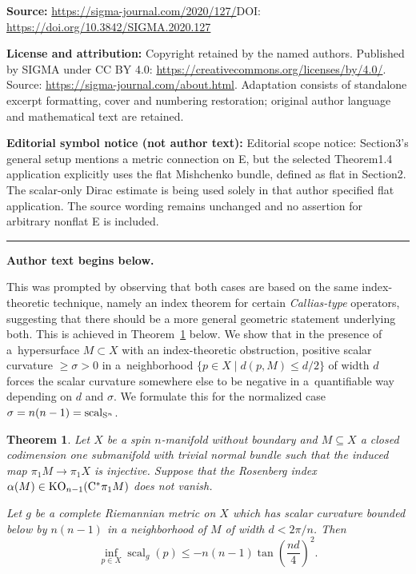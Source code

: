 \documentclass[11pt]{article}
\DeclareMathOperator{\scal}{scal}
\DeclareMathOperator{\KO}{KO}
\numberwithin{equation}{section}
\newtheorem{Theorem}{Theorem}[section]
\begin{document}
\noindent\textbf{Source:} \url{https://sigma-journal.com/2020/127/}\quad DOI: \url{https://doi.org/10.3842/SIGMA.2020.127}\par
\noindent\textbf{License and attribution:} Copyright retained by the named authors. Published by SIGMA under CC BY 4.0: \url{https://creativecommons.org/licenses/by/4.0/}. Source: \url{https://sigma-journal.com/about.html}. Adaptation consists of standalone excerpt formatting, cover and numbering restoration; original author language and mathematical text are retained.\par
\noindent\textbf{Editorial symbol notice (not author text):} Editorial scope notice: Section3’s general setup mentions a metric connection on E, but the selected Theorem1.4 application explicitly uses the flat Mishchenko bundle, defined as flat in Section2. The scalar-only Dirac estimate is being used solely in that author specified flat application. The source wording remains unchanged and no assertion for arbitrary nonflat E is included.\par
\medskip\hrule\medskip\noindent\textbf{Author text begins below.}\par
\setcounter{section}{1}
\setcounter{subsection}{0}
\setcounter{subsubsection}{0}
\setcounter{Theorem}{3}
\setcounter{equation}{0}
This was prompted by observing that both cases are based on the same index-theoretic technique, namely an index theorem for certain \emph{Callias-type} operators, suggesting that there should be a more general geometric statement underlying both.
This is achieved in Theorem~\ref{thm:quantitative-codim1-obstr} below.
We show that in the presence of a~hypersurface \(M \subset X\) with an index-theoretic obstruction, positive scalar curvature \(\geq \sigma > 0\) in a~neighborhood \(\{p \in X \mid d(p, M) \leq d/2 \}\) of width \(d\) forces the scalar curvature somewhere else to be negative in a~quantifiable way depending on \(d\) and \(\sigma\).
We formulate this for the normalized case \(\sigma = n(n-1) = \scal_{\Sphere^n}\).

\begin{Theorem} \label{thm:quantitative-codim1-obstr}
 Let \(X\) be a spin \(n\)-manifold without boundary and \(M \subseteq X\) a closed codimension one submanifold with trivial normal bundle such that the induced map \(\pi_1 M \to \pi_1 X\) is injective.
 Suppose that the Rosenberg index \(\alpha(M) \in \KO_{n-1}(\Cstar \pi_1 M)\) does not vanish.

 Let \(g\) be a complete Riemannian metric on \(X\) which has scalar curvature bounded below by \(n(n-1)\) in a neighborhood of \(M\) of width \(d < 2\pi/n\).
 Then
 \begin{equation} \label{eq:negativity}
 \inf_{p \in X} \scal_g(p) \leq - n(n-1) \tan\left(\frac{nd}{4}\right)^2.
 \end{equation}
\end{Theorem}
\end{document}
